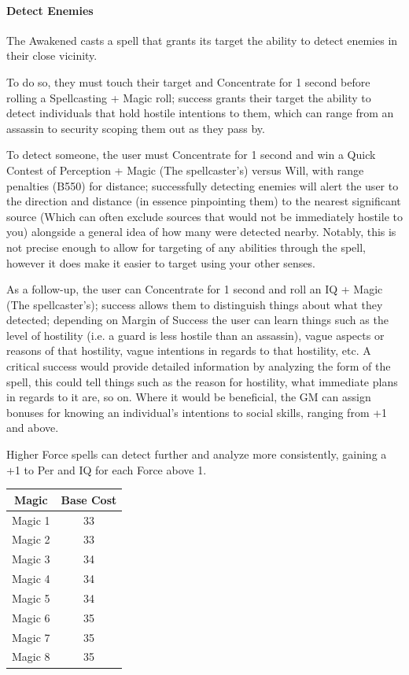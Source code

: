 \begin{multicols*}{3}
	\paragraph{Detect Enemies}
	
	The Awakened casts a spell that grants its target the ability to detect enemies in their close vicinity.
	
	To do so, they must touch their target and Concentrate for 1 second before rolling a Spellcasting + Magic roll; success grants their target the ability to detect individuals that hold hostile intentions to them, which can range from an assassin to security scoping them out as they pass by. 
	
	To detect someone, the user must Concentrate for 1 second and win a Quick Contest of Perception + Magic (The spellcaster's) versus Will, with range penalties (B550) for distance; successfully detecting enemies will alert the user to the direction and distance (in essence pinpointing them) to the nearest significant source (Which can often exclude sources that would not be immediately hostile to you) alongside a general idea of how many were detected nearby. Notably, this is not precise enough to allow for targeting of any abilities through the spell, however it does make it easier to target using your other senses.
	
	As a follow-up, the user can Concentrate for 1 second and roll an IQ + Magic (The spellcaster's); success allows them to distinguish things about what they detected; depending on Margin of Success the user can learn things such as the level of hostility (i.e. a guard is less hostile than an assassin), vague aspects or reasons of that hostility, vague intentions in regards to that hostility, etc. A critical success would provide detailed information by analyzing the form of the spell, this could tell things such as the reason for hostility, what immediate plans in regards to it are, so on. Where it would be beneficial, the GM can assign bonuses for knowing an individual's intentions to social skills, ranging from +1 and above.
	
	Higher Force spells can detect further and analyze more consistently, gaining a +1 to Per and IQ for each Force above 1.	
	
	\begin{center}
		\begin{tabular}{|c|c|}
			\hline
			Magic & Base Cost \\
			\hline
			\hline
			Magic 1 & 33 \\
			Magic 2 & 33 \\
			Magic 3 & 34 \\
			Magic 4 & 34 \\
			Magic 5 & 34 \\
			Magic 6 & 35 \\
			Magic 7 & 35 \\
			Magic 8 & 35 \\
			\hline
		\end{tabular}
	\end{center} 
	

\end{multicols*}
